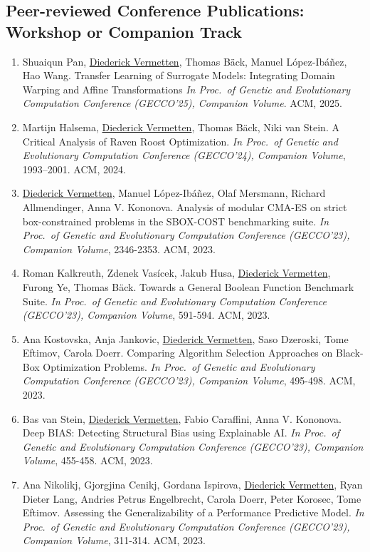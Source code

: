 \subsection*{Peer-reviewed Conference Publications: Workshop or Companion Track}
\begin{enumerate}
    \item  Shuaiqun Pan, \underline{Diederick Vermetten}, Thomas B\"ack, Manuel López-Ibáñez, Hao Wang. Transfer Learning of Surrogate Models: Integrating Domain Warping and Affine Transformations
    \emph{In Proc.~of Genetic and Evolutionary Computation Conference (GECCO'25), Companion Volume}. ACM, 2025.
    
    \item Martijn Halsema, \underline{Diederick Vermetten}, Thomas B\"ack, Niki van Stein. A Critical Analysis of Raven Roost Optimization.
    \emph{In Proc.~of Genetic and Evolutionary Computation Conference (GECCO'24), Companion Volume}, 1993–2001. ACM, 2024.
    
    \item \underline{Diederick Vermetten}, Manuel López-Ibáñez, Olaf Mersmann, Richard Allmendinger, Anna V. Kononova. Analysis of modular CMA-ES on strict box-constrained problems in the SBOX-COST benchmarking suite. 
    \emph{In Proc.~of Genetic and Evolutionary Computation Conference (GECCO'23), Companion Volume}, 2346-2353. ACM, 2023.
    
    \item Roman Kalkreuth, Zdenek Vasícek, Jakub Husa, \underline{Diederick Vermetten}, Furong Ye, Thomas Bäck. Towards a General Boolean Function Benchmark Suite.
    \emph{In Proc.~of Genetic and Evolutionary Computation Conference (GECCO'23), Companion Volume}, 591-594. ACM, 2023.
    
    \item Ana Kostovska, Anja Jankovic, \underline{Diederick Vermetten}, Saso Dzeroski, Tome Eftimov, Carola Doerr. Comparing Algorithm Selection Approaches on Black-Box Optimization Problems. 
    \emph{In Proc.~of Genetic and Evolutionary Computation Conference (GECCO'23), Companion Volume}, 495-498. ACM, 2023.
    
    \item Bas van Stein, \underline{Diederick Vermetten}, Fabio Caraffini, Anna V. Kononova. Deep BIAS: Detecting Structural Bias using Explainable AI. 
    \emph{In Proc.~of Genetic and Evolutionary Computation Conference (GECCO'23), Companion Volume}, 455-458. ACM, 2023.
    
    \item Ana Nikolikj, Gjorgjina Cenikj, Gordana Ispirova, \underline{Diederick Vermetten}, Ryan Dieter Lang, Andries Petrus Engelbrecht, Carola Doerr, Peter Korosec, Tome Eftimov. Assessing the Generalizability of a Performance Predictive Model. 
    \emph{In Proc.~of Genetic and Evolutionary Computation Conference (GECCO'23), Companion Volume}, 311-314. ACM, 2023.
    

\end{enumerate}
